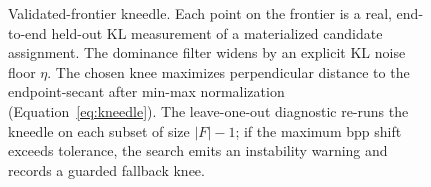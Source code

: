 \begin{figure}[t]
\caption{Validated-frontier kneedle. Each point on the frontier is a
real, end-to-end held-out KL measurement of a materialized candidate
assignment. The dominance filter widens by an explicit KL noise floor
$\eta$. The chosen knee maximizes perpendicular distance to the
endpoint-secant after min-max normalization
(Equation~\ref{eq:kneedle}). The leave-one-out diagnostic re-runs the
kneedle on each subset of size $|F|-1$; if the maximum bpp shift exceeds
tolerance, the search emits an instability warning and records a guarded
fallback knee.}
\label{fig:kneedle}
\end{figure}
